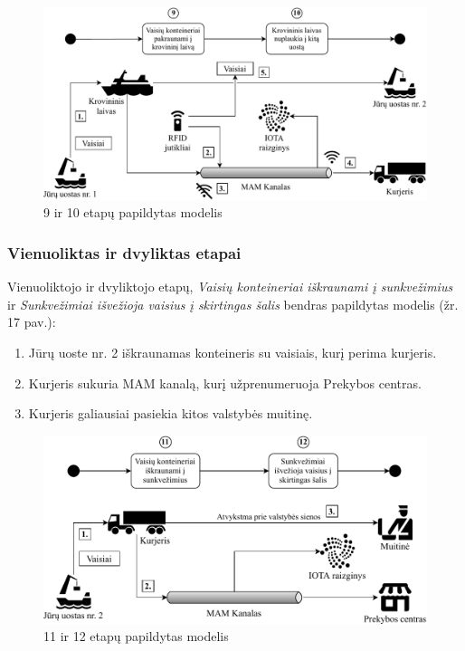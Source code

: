 \begin{figure}[H]
    \centering
    \includegraphics[scale=0.68]{images/iota-usecase-9-10}
    \caption{9 ir 10 etapų papildytas modelis}
\end{figure}




\subsubsection{Vienuoliktas ir dvyliktas etapai}

Vienuoliktojo ir dvyliktojo etapų, \textit{Vaisių konteineriai iškraunami į sunkvežimius} ir \textit{Sunkvežimiai išvežioja vaisius į skirtingas šalis} bendras papildytas modelis (žr. 17 pav.):
\begin{enumerate}
    \item Jūrų uoste nr. 2 iškraunamas konteineris su vaisiais, kurį perima kurjeris.
    \item Kurjeris sukuria MAM kanalą, kurį užprenumeruoja Prekybos centras.
    \item Kurjeris galiausiai pasiekia kitos valstybės muitinę.
\end{enumerate}

\begin{figure}[H]
    \centering
    \includegraphics[scale=0.70]{images/iota-usecase-11-12}
    \caption{11 ir 12 etapų papildytas modelis}
\end{figure}



